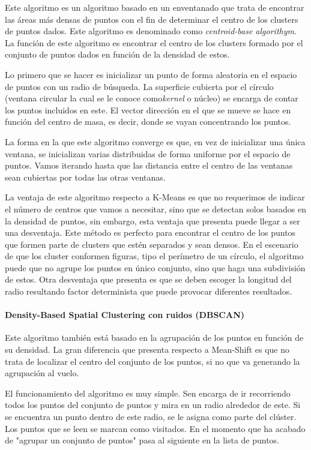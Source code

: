 \documentclass[conference,a4paper]{IEEEtran}
\begin{document}
Este algoritmo es un algoritmo basado en un enventanado que trata de encontrar las áreas más densas de puntos con el fin de determinar el centro de los clusters de puntos dados. Este algoritmo es denominado como \textit{centroid-base algorithym}. La función de este algoritmo es encontrar el centro de los clusters formado por el conjunto de puntos dados en función de la densidad de estos.

Lo primero que se hacer es inicializar un punto de forma aleatoria en el espacio de puntos con un radio de búsqueda. La superficie cubierta por el círculo (ventana circular la cual se le conoce como\textit{kernel} o núcleo) se encarga de contar los puntos incluidos en este. El vector dirección en el que se mueve se hace en función del centro de masa, es decir, donde se vayan concentrando los puntos.

La forma en la que este algoritmo converge es que, en vez de inicializar una única ventana, se inicializan varias distribuidas de forma uniforme por el espacio de puntos. Vamos iterando hasta que las distancia entre el centro de las ventanas sean cubiertas por todas las otras ventanas.

La ventaja de este algoritmo respecto a K-Means es que no requerimos de indicar el número de centros que vamos a necesitar, sino que se detectan solos basados en la densidad de puntos, sin embargo, esta ventaja que presenta puede llegar a ser una desventaja. Este método es perfecto para encontrar el centro de los puntos que formen parte de clusters que estén separados y sean densos. En el escenario de que los cluster conformen figuras, tipo el perímetro de un círculo, el algoritmo puede que no agrupe los puntos en único conjunto, sino que haga una subdivisión de estos. Otra desventaja que presenta es que se deben escoger la longitud del radio resultando factor determinista que puede provocar diferentes resultados.

\paragraph{\textbf{Density-Based Spatial Clustering con ruidos (DBSCAN)}}

Este algoritmo también está basado en la agrupación de los puntos en función de su densidad. La gran diferencia que presenta respecto a Mean-Shift es que no trata de localizar el centro del conjunto de los puntos, si no que va generando la agrupación al vuelo.

El funcionamiento del algoritmo es muy simple. Sen encarga de ir recorriendo todos los puntos del conjunto de puntos y mira en un radio alrededor de este. Si se encuentra un punto dentro de este radio, se le asigna como parte del clúster. Los puntos que se leen se marcan como visitados. En el momento que ha acabado de "agrupar un conjunto de puntos" pasa al siguiente en la lista de puntos.
\end{document}
